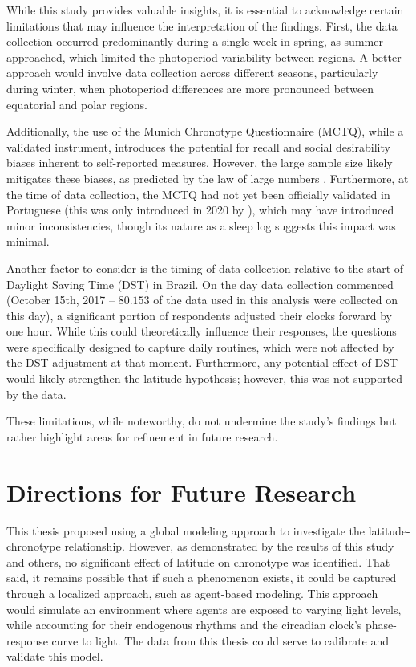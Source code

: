 \documentclass[
12pt,
openright,
oneside,
a4paper,
chapter=TITLE,
section=TITLE,
french,
spanish,
brazil,
english
]{abntex2}
\begin{document}
While this study provides valuable insights, it is essential to
acknowledge certain limitations that may influence the interpretation of
the findings. First, the data collection occurred predominantly during a
single week in spring, as summer approached, which limited the
photoperiod variability between regions. A better approach would involve
data collection across different seasons, particularly during winter,
when photoperiod differences are more pronounced between equatorial and
polar regions.

Additionally, the use of the Munich Chronotype Questionnaire (MCTQ),
while a validated instrument, introduces the potential for recall and
social desirability biases inherent to self-reported measures. However,
the large sample size likely mitigates these biases, as predicted by the
law of large numbers \autocite[352]{degroot2012}. Furthermore, at the
time of data collection, the MCTQ had not yet been officially validated
in Portuguese (this was only introduced in 2020 by
\textcite{reis2020a}), which may have introduced minor inconsistencies,
though its nature as a sleep log suggests this impact was minimal.

Another factor to consider is the timing of data collection relative to
the start of Daylight Saving Time (DST) in Brazil. On the day data
collection commenced (October 15th, 2017 -- \(80.153%
\) of the data used in this analysis were collected on this day), a
significant portion of respondents adjusted their clocks forward by one
hour. While this could theoretically influence their responses, the
questions were specifically designed to capture daily routines, which
were not affected by the DST adjustment at that moment. Furthermore, any
potential effect of DST would likely strengthen the latitude hypothesis;
however, this was not supported by the data.

These limitations, while noteworthy, do not undermine the study's
findings but rather highlight areas for refinement in future research.

\section{Directions for Future
Research}\label{directions-for-future-research}

This thesis proposed using a global modeling approach to investigate the
latitude-chronotype relationship. However, as demonstrated by the
results of this study and others, no significant effect of latitude on
chronotype was identified. That said, it remains possible that if such a
phenomenon exists, it could be captured through a localized approach,
such as agent-based modeling. This approach would simulate an
environment where agents are exposed to varying light levels, while
accounting for their endogenous rhythms and the circadian clock's
phase-response curve to light. The data from this thesis could serve to
calibrate and validate this model.
\end{document}
